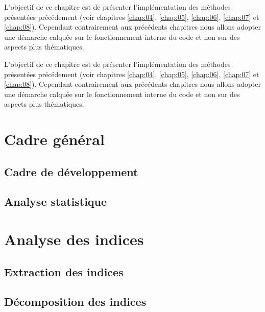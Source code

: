 %

\chaptertoc{}

L'objectif de ce chapitre est de présenter l'implémentation des
méthodes présentées précédement (voir chapitres \ref{chap:04},
\ref{chap:05}, \ref{chap:06}, \ref{chap:07} et
\ref{chap:08}). Cependant contrairement aux précédents chapitres nous
allons adopter une démarche calquée sur le fonctionnement interne du
code et non sur des aspects plus thématiques.


L'objectif de ce chapitre est de présenter l'implémentation des
méthodes présentées précédement (voir chapitres \ref{chap:04},
\ref{chap:05}, \ref{chap:06}, \ref{chap:07} et
\ref{chap:08}). Cependant contrairement aux précédents chapitres nous
allons adopter une démarche calquée sur le fonctionnement interne du
code et non sur des aspects plus thématiques.

\section{Cadre général}

\subsection{Cadre de développement}



\subsection{Analyse statistique}



\section{Analyse des indices}
\label{sec:9-1}

\subsection{Extraction des indices}
\label{subsec:9-1-1}

\subsection{Décomposition des indices}
\label{subsec:9-1-2}

